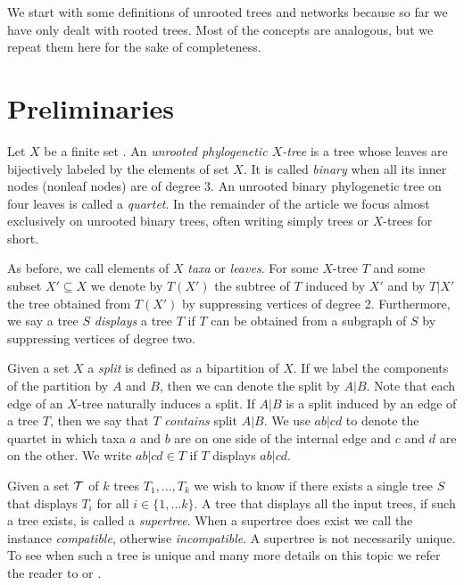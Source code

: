 
We start with some definitions of unrooted trees and networks because so far we have only dealt with rooted trees. Most of the concepts are analogous, but we repeat them here for the sake of completeness.


\section{Preliminaries}


Let $X$ be a finite set . An \emph{unrooted phylogenetic $X$-tree} is a tree whose leaves are bijectively labeled by the elements of set $X$. It is called \emph{binary} when all its inner nodes (nonleaf nodes) are of degree 3. An unrooted binary phylogenetic tree on four leaves is called a \emph{quartet}. In the remainder of the article we focus almost exclusively on unrooted binary trees, often writing simply trees or $X$-trees for short.

As before, we call elements of $X$ \emph{taxa} or \emph{leaves}. For some $X$-tree $T$ and some subset $X' \subseteq X$ we denote by $T(X')$ the subtree of $T$ induced by $X'$ and by $T|X'$ the tree obtained from $T(X')$ by suppressing vertices of degree 2. Furthermore, we say a tree $S$ \emph{displays} a tree $T$ if $T$ can be obtained from a subgraph of $S$
by suppressing vertices of degree two.

Given a set $X$ a \emph{split} is defined as a bipartition of $X$. If we label the components of the partition by $A$ and $B$, then we can denote the split by $A|B$. Note that each edge of an $X$-tree naturally induces a split. If $A|B$ is a split induced by an edge of a tree $T$, then we say that $T$ \emph{contains} split $A|B$. We use $ab|cd$ to denote the quartet in which taxa $a$ and $b$ are on one side of the internal edge and $c$ and $d$ are on the other. We write $ab|cd \in T$ if $T$ displays $ab|cd$.


Given a set ${\mathcal T}$ of $k$ trees $T_1,...,T_k$ we wish to know if there exists a single tree $S$ that displays $T_i$ for all $i \in\{1,...k\}$. A tree that displays all the input trees, if such a tree exists, is called a \emph{supertree}. When a supertree does exist we call the instance \emph{compatible}, otherwise \emph{incompatible}. A supertree is not necessarily unique. To see when such a tree is unique and many more details on this topic we refer the reader to \cite{DreHub12} or \cite{SemSte03}.


